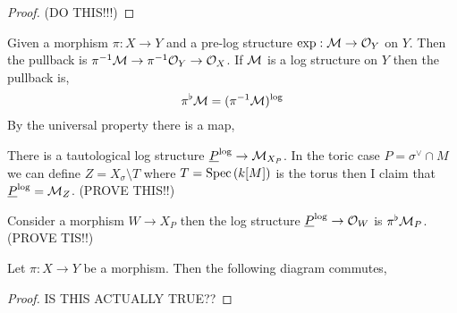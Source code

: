 \documentclass[12pt]{article}
\begin{document}
\begin{proof}
(DO THIS!!!)
\end{proof}

\begin{defn}
Given a morphism $\pi : X \to Y$ and a pre-log structure $\exp : \mathcal{M} \to \mathcal{O}_{Y}$ on $Y$. Then the pullback is $\pi^{-1} \mathcal{M} \to \pi^{-1} \mathcal{O}_{Y} \to \mathcal{O}_{X}$. If $\mathcal{M}$ is a log structure on $Y$ then the pullback is,
\[ \pi^\flat \mathcal{M} = (\pi^{-1} \mathcal{M})^{\log} \]
By the universal property there is a map,
\begin{center}
\end{center}
\end{defn}

\begin{rmk}
There is a tautological log structure $\underline{P}^{\log} \to \mathcal{M}_{X_P}$. In the toric case $P = \sigma^\vee \cap M$ we can define $Z = X_\sigma \setminus T$ where $T = \mathrm{Spec}\left( k[M] \right)$ is the torus then I claim that $\underline{P}^{\log} = \mathcal{M}_Z$. (PROVE THIS!!)
\end{rmk}

\begin{rmk}
Consider a morphism $W \to X_P$ then the log structure $\underline{P}^{\log} \to \mathcal{O}_{W}$ is $\pi^\flat \mathcal{M}_{P}$. (PROVE TIS!!)
\end{rmk}

\begin{prop}
Let $\pi : X \to Y$ be a morphism. Then the following diagram commutes,
\begin{center}
\end{center}
\end{prop}

\begin{proof}
IS THIS ACTUALLY TRUE??
\end{proof}
\end{document}

